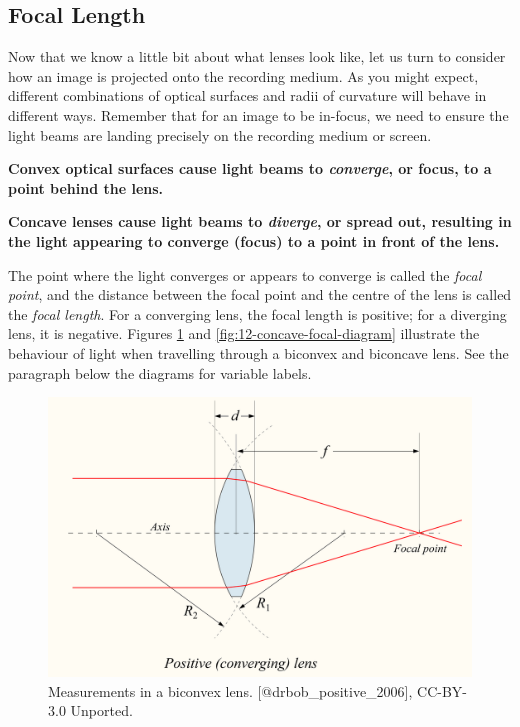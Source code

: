\documentclass[
]{book}
\begin{document}
\subsection{Focal Length}\label{focal-length}

Now that we know a little bit about what lenses look like, let us turn to consider how an image is projected onto the recording medium. As you might expect, different combinations of optical surfaces and radii of curvature will behave in different ways. Remember that for an image to be in-focus, we need to ensure the light beams are landing precisely on the recording medium or screen.

\textbf{Convex optical surfaces cause light beams to \emph{converge}, or focus, to a point behind the lens.}

\textbf{Concave lenses cause light beams to \emph{diverge}, or spread out, resulting in the light appearing to converge (focus) to a point in front of the lens.}

The point where the light converges or appears to converge is called the \emph{focal point}, and the distance between the focal point and the centre of the lens is called the \emph{focal length}. For a converging lens, the focal length is positive; for a diverging lens, it is negative. Figures \ref{fig:12-convex-focal-diagram} and \ref{fig:12-concave-focal-diagram} illustrate the behaviour of light when travelling through a biconvex and biconcave lens. See the paragraph below the diagrams for variable labels.

\begin{figure}
\includegraphics[width=0.9\linewidth]{images/12-convex_focal_diagram} \caption{Measurements in a biconvex lens. [@drbob_positive_2006], CC-BY-3.0 Unported.}\label{fig:12-convex-focal-diagram}
\end{figure}
\end{document}
